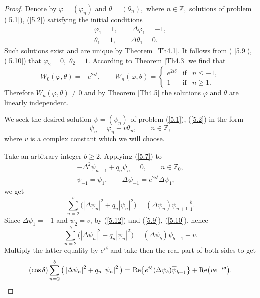 \documentclass[11pt]{article}
\numberwithin{equation}{section}
\begin{document}
\begin{proof}
Denote by $\varphi =(\varphi _{n})$ and $\theta =(\theta _{n}),$ where $n\in
\mathbb{Z}
,$ solutions of problem (\ref{5.1}), (\ref{5.2}) satisfying the initial
conditions%
\begin{gather}
\varphi _{1}=1,\qquad \Delta \varphi _{1}=-1,  \label{5.9}
\\
\theta _{1}=1,\qquad \Delta \theta _{1}=0.  \label{5.10}
\end{gather}%
Such solutions exist and are unique by Theorem~\ref{Th4.1}. It follows from (%
\ref{5.9}), (\ref{5.10}) that $\varphi _{2}=0,$ $\theta _{2}=1.$ According
to Theorem \ref{Th4.3} we f\/ind that%
\begin{equation}
W_{0}(\varphi ,\theta )=-e^{2i\delta },\qquad W_{n}(\varphi ,\theta
)=\left\{
\begin{array}{lll}
e^{2i\delta } & \text{if} & n\leq -1, \\
1 & \text{if} & n\geq 1.%
\end{array}%
\right.  \label{5.11}
\end{equation}%
Therefore $W_{n}(\varphi ,\theta )\neq 0$ and by Theorem \ref{Th4.5} the
solutions $\varphi $ and $\theta $ are linearly independent.

We seek the desired solution $\psi =(\psi _{n})$ of problem (\ref{5.1}), (\ref{5.2}) in the form%
\begin{equation}
\psi _{n}=\varphi _{n}+v\theta _{n},\qquad n\in
\mathbb{Z}
,  \label{5.12}
\end{equation}%
where $v$ is a complex constant which we will choose.

Take an arbitrary integer $b\geq 2$. Applying (\ref{5.7}) to%
\begin{gather*}
-\Delta ^{2}\psi _{n-1}+q_{n}\psi _{n}=0,\qquad n\in
\mathbb{Z}
_{0},
\\
\psi _{-1}=\psi _{1},\qquad \Delta \psi _{-1}=e^{2i\delta }\Delta \psi
_{1},
\end{gather*}
we get%
\begin{equation*}
\sum_{n=2}^{b}\big( \left\vert \Delta \psi _{n}\right\vert
^{2}+q_{n}\left\vert \psi _{n}\right\vert ^{2}\big) =(\Delta \psi _{n})%
\overline{\psi }_{n+1}\big|_{1}^{b}.  %
\end{equation*}%
Since $\Delta \psi _{1}=-1$ and $\psi _{2}=v$, by (\ref{5.12}) and (\ref{5.9}), (\ref{5.10}), hence%
\[
\sum_{n=2}^{b}\big( \left\vert \Delta \psi _{n}\right\vert
^{2}+q_{n}\left\vert \psi _{n}\right\vert ^{2}\big) =(\Delta \psi _{b})%
\overline{\psi }_{b+1}+\overline{v}.
\]%
Multiply the latter equality by $e^{i\delta }$ and take then the real part
of both sides to get%
\begin{equation}
(\cos \delta )\sum_{n=2}^{b}\big( \left\vert \Delta \psi _{n}\right\vert
^{2}+q_{n}\left\vert \psi _{n}\right\vert ^{2}\big) ={\rm Re}\big\{e^{i\delta
}(\Delta \psi _{b})\overline{\psi }_{b+1}\big\}+{\rm Re}\big(ve^{-i\delta }\big).
\label{5.14}
\end{equation}


\end{proof}
\end{document}
